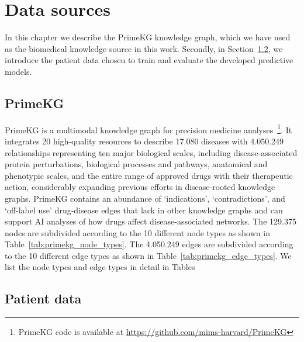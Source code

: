 \chapter{Data sources}\label{data_sources}
In this chapter we describe the PrimeKG knowledge graph\cite{ChandakPayal2023Bakg}, which we have used as the biomedical knowledge source in this work. Secondly, in Section~\ref{data_sources:patient_data}, we introduce the patient data chosen to train and evaluate the developed predictive models.

\section{PrimeKG}\label{data_sources:primekg}

PrimeKG is a multimodal knowledge graph for precision medicine analyses~\cite{ChandakPayal2023Bakg}\footnote{PrimeKG code is available at \url{https://github.com/mims-harvard/PrimeKG}}. It integrates 20 high-quality resources to describe 17.080 diseases with 4.050.249 relationships representing ten major biological scales, including disease-associated protein perturbations, biological processes and pathways, anatomical and phenotypic scales, and the entire range of approved drugs with their therapeutic action, considerably expanding previous efforts in disease-rooted knowledge graphs. PrimeKG contains an abundance of ‘indications’, ‘contradictions’, and ‘off-label use’ drug-disease edges that lack in other knowledge graphs and can support AI analyses of how drugs affect disease-associated networks. 
The 129.375 nodes are subdivided according to the 10 different node types as shown in Table~\ref{tab:primekg_node_types}. The 4.050.249 edges are subdivided according to the 10 different edge types as shown in Table~\ref{tab:primekg_edge_types}.
We list the node types and edge types in detail in Tables





\section{Patient data}\label{data_sources:patient_data}